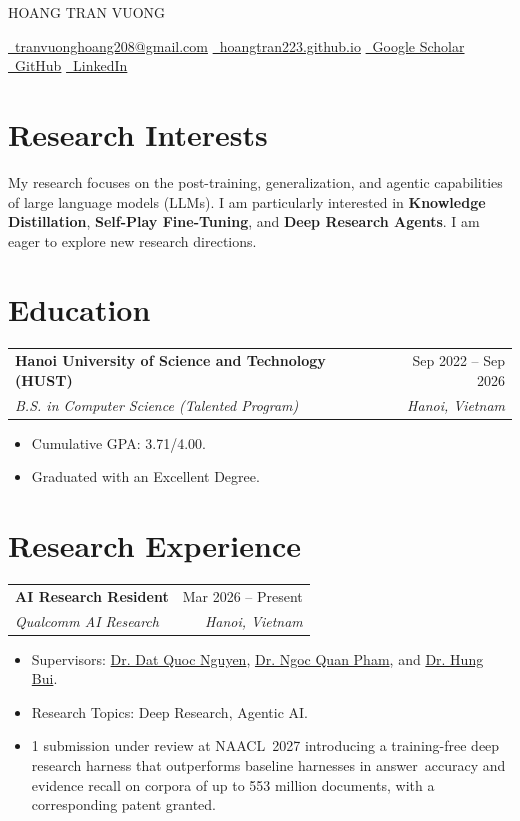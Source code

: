 \documentclass[letterpaper,11pt]{article}
\makeatletter
\newcommand{\entry}[4]{%
  \Needspace{5\baselineskip}%
  \begin{tabularx}{\linewidth}{@{}Xr@{}}
    \textbf{#1} & #2 \\
    \textit{#3} & \textit{#4}
  \end{tabularx}\par\nopagebreak
}
\makeatother
\begin{document}
\begin{center}
  {\selectfont\huge\uppercase{Hoang Tran Vuong}}\par\vspace{5pt}
  {\small
    \href{mailto:tranvuonghoang208@gmail.com}{\faEnvelope\ tranvuonghoang208@gmail.com}
    \enspace\textbar\enspace
    \href{https://hoangtran223.github.io/}{\faLink\ hoangtran223.github.io} \enspace\textbar\enspace
    \href{https://scholar.google.com/citations?user=Ep7aknoAAAAJ}{\faGraduationCap\ Google Scholar} \enspace\textbar\enspace
    \href{https://github.com/HoangTran223}{\faGithub\ GitHub} \enspace\textbar\enspace
    \href{https://www.linkedin.com/in/tranvuonghoang/}{\faLinkedin\ LinkedIn}
  }
\end{center}
\vspace{-4pt}

\section{Research Interests}
My research focuses on the post-training, generalization, and agentic capabilities of large language models (LLMs). I am particularly interested in \textbf{Knowledge Distillation}, \textbf{Self-Play Fine-Tuning}, and \textbf{Deep Research Agents}. I am eager to explore new research directions.

\section{Education}
\entry{Hanoi University of Science and Technology (HUST)}{Sep 2022 -- Sep 2026}
  {B.S. in Computer Science (Talented Program)}{Hanoi, Vietnam}
\begin{itemize}
  \item Cumulative GPA: 3.71/4.00.
  \item Graduated with an Excellent Degree.
\end{itemize}

\section{Research Experience}
\entry{AI Research Resident}{Mar 2026 -- Present}
  {Qualcomm AI Research}{Hanoi, Vietnam}
\begin{itemize}
  \item Supervisors: \href{https://scholar.google.com/citations?user=HVl7vyEAAAAJ}{Dr. Dat Quoc Nguyen}, \href{https://scholar.google.com/citations?user=AzzJssIAAAAJ}{Dr. Ngoc Quan Pham}, and \href{https://scholar.google.com/citations?user=mDLwSZAAAAAJ}{Dr. Hung Bui}.
  \item Research Topics: Deep Research, Agentic AI.
  \item 1 submission under review at \mbox{NAACL 2027} introducing a training-free deep research harness that \mbox{outperforms} baseline harnesses in \mbox{answer accuracy} and evidence recall on corpora of up to 553 million documents, with a corresponding patent granted.
\end{itemize}
\vspace{3pt}
\end{document}
